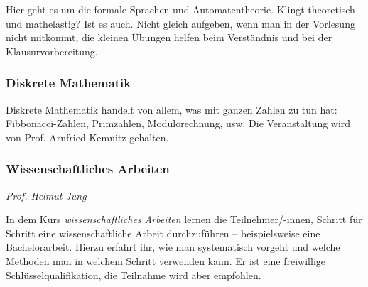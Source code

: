 \begin{multicols}{2}
	Hier geht es um die formale Sprachen und Automatentheorie. Klingt theoretisch und mathelastig? Ist es auch. Nicht gleich aufgeben, wenn man in der Vorlesung nicht mitkommt, die kleinen Übungen helfen beim Verständnis und bei der Klausurvorbereitung.

\subsubsection{Diskrete Mathematik}

	Diskrete Mathematik handelt von allem, was mit ganzen Zahlen zu tun hat: Fibbonacci-Zahlen, Primzahlen, Modulorechnung, usw. Die Veranstaltung wird von Prof. Arnfried Kemnitz gehalten.

\subsubsection{Wissenschaftliches Arbeiten}
	\textit{Prof. Helmut Jung}
	
	In dem Kurs \emph{wissenschaftliches Arbeiten} lernen die Teilnehmer/-innen, Schritt für Schritt eine wissenschaftliche Arbeit durchzuführen -- beispielsweise eine Bachelorarbeit. Hierzu erfahrt ihr, wie man systematisch vorgeht und welche Methoden man in welchem Schritt verwenden kann. Er ist eine freiwillige Schlüsselqualifikation, die Teilnahme wird aber empfohlen.
\end{multicols}
